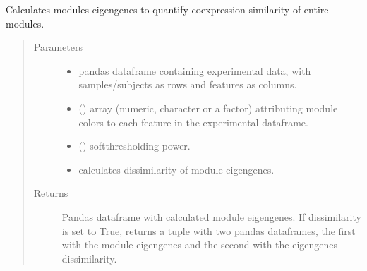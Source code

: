 \documentclass[letterpaper,10pt,english]{sphinxmanual}
\begin{document}

\begin{fulllineitems}
\label{\detokenize{_autosummary/analytics_core.analytics:analytics_core.analytics.wgcnaAnalysis.calculate_module_eigengenes}}
Calculates modules eigengenes to quantify co\sphinxhyphen{}expression similarity of entire modules.
\begin{quote}\begin{description}
\item[{Parameters}] \leavevmode\begin{itemize}
\item {} 
 \textendash{} pandas dataframe containing experimental data, with samples/subjects as rows and features as columns.

\item {} 
 () \textendash{} array (numeric, character or a factor) attributing module colors to each feature in the experimental dataframe.

\item {} 
 () \textendash{} soft\sphinxhyphen{}thresholding power.

\item {} 
 \textendash{} calculates dissimilarity of module eigengenes.

\end{itemize}

\item[{Returns}] \leavevmode
Pandas dataframe with calculated module eigengenes. If dissimilarity is set to True, returns a tuple with two pandas dataframes, the first with the module eigengenes and the second with the eigengenes dissimilarity.

\end{description}\end{quote}

\end{fulllineitems}
\end{document}

